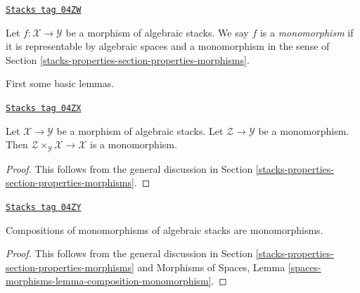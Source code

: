 \begin{definition}[Monomorphism]
\label{stacks-properties-definition-monomorphism}
\href{https://stacks.math.columbia.edu/tag/04ZW}{\texttt{Stacks tag 04ZW}}

Let $f : \mathcal{X} \to \mathcal{Y}$ be a morphism of algebraic stacks.
We say $f$ is a {\it monomorphism}
if it is representable by algebraic spaces and a monomorphism in the sense of
Section \ref{stacks-properties-section-properties-morphisms}.
\end{definition}

First some basic lemmas.

\begin{lemma}
\label{stacks-properties-lemma-base-change-monomorphism}
\href{https://stacks.math.columbia.edu/tag/04ZX}{\texttt{Stacks tag 04ZX}}

Let $\mathcal{X} \to \mathcal{Y}$ be a morphism of algebraic stacks.
Let $\mathcal{Z} \to \mathcal{Y}$ be a monomorphism.
Then $\mathcal{Z} \times_\mathcal{Y} \mathcal{X} \to \mathcal{X}$
is a monomorphism.
\end{lemma}

\begin{proof}
This follows from the general discussion in
Section \ref{stacks-properties-section-properties-morphisms}.
\end{proof}

\begin{lemma}
\label{stacks-properties-lemma-composition-monomorphism}
\href{https://stacks.math.columbia.edu/tag/04ZY}{\texttt{Stacks tag 04ZY}}

Compositions of monomorphisms of algebraic stacks are monomorphisms.
\end{lemma}

\begin{proof}
This follows from the general discussion in
Section \ref{stacks-properties-section-properties-morphisms}
and
Morphisms of Spaces,
Lemma \ref{spaces-morphisms-lemma-composition-monomorphism}.
\end{proof}

